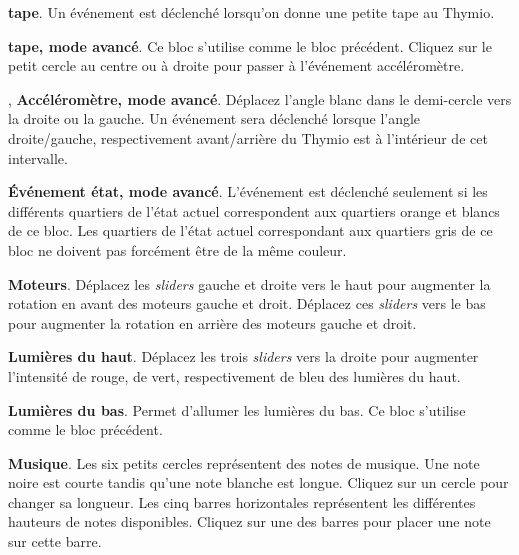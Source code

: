 \bigskip\bigskip\bigskip

 \textbf{tape}. Un événement est déclenché lorsqu'on donne une petite tape au Thymio.

\bigskip\bigskip\bigskip

 \textbf{tape, mode avancé}.
Ce bloc s'utilise comme le bloc précédent.
Cliquez sur le petit cercle au centre ou à droite pour passer à l'événement accéléromètre.

\bigskip\bigskip

,  \textbf{Accéléromètre, mode avancé}.
Déplacez l'angle blanc dans le demi-cercle vers la droite ou la gauche.
Un événement sera déclenché lorsque l'angle droite/gauche, respectivement avant/arrière 
du Thymio est à l'intérieur de cet intervalle.

\bigskip\bigskip\bigskip\bigskip

 \textbf{Événement état, mode avancé}.
L'événement est déclenché seulement si les différents quartiers de l'état actuel
correspondent aux quartiers orange et blancs de ce bloc.
Les quartiers de l'état actuel correspondant aux quartiers gris de ce bloc ne doivent pas forcément
être de la même couleur.

\bigskip


 \textbf{Moteurs}.
Déplacez les \emph{sliders} gauche et droite vers le haut pour augmenter la rotation en avant des
moteurs gauche et droit.
Déplacez ces \emph{sliders} vers le bas pour augmenter la rotation en arrière des moteurs
gauche et droit.

\bigskip\bigskip

 \textbf{Lumières du haut}.
Déplacez les trois \emph{sliders} vers la droite pour augmenter l'intensité de rouge, de vert,
respectivement de bleu des lumières du haut.

\bigskip\bigskip

 \textbf{Lumières du bas}.
Permet d'allumer les lumières du bas. Ce bloc s'utilise comme le bloc précédent.

\bigskip\bigskip\bigskip\bigskip

 \textbf{Musique}.
Les six petits cercles représentent des notes de musique.
Une note noire est courte tandis qu'une note blanche est longue.
Cliquez sur un cercle pour changer sa longueur.
Les cinq barres horizontales représentent les différentes hauteurs de notes disponibles.
Cliquez sur une des barres pour placer une note sur cette barre.

